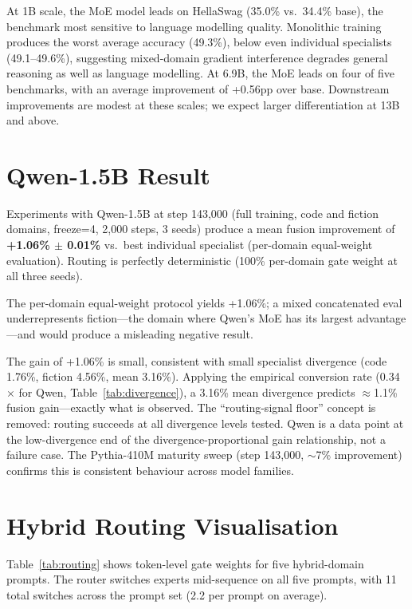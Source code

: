 \documentclass{article}
\begin{document}
At 1B scale, the MoE model leads on HellaSwag (35.0\% vs.\ 34.4\% base), the benchmark most sensitive to language modelling quality. Monolithic training produces the worst average accuracy (49.3\%), below even individual specialists (49.1--49.6\%), suggesting mixed-domain gradient interference degrades general reasoning as well as language modelling. At 6.9B, the MoE leads on four of five benchmarks, with an average improvement of +0.56pp over base. Downstream improvements are modest at these scales; we expect larger differentiation at 13B and above.

\section{Qwen-1.5B Result}
\label{app:qwen}

Experiments with Qwen-1.5B at step 143,000 (full training, code and fiction domains, freeze=4, 2,000 steps, 3 seeds) produce a mean fusion improvement of \textbf{+1.06\% $\pm$ 0.01\%} vs.\ best individual specialist (per-domain equal-weight evaluation). Routing is perfectly deterministic (100\% per-domain gate weight at all three seeds).

The per-domain equal-weight protocol yields +1.06\%; a mixed concatenated eval underrepresents fiction---the domain where Qwen's MoE has its largest advantage---and would produce a misleading negative result.

The gain of +1.06\% is small, consistent with small specialist divergence (code 1.76\%, fiction 4.56\%, mean 3.16\%). Applying the empirical conversion rate (0.34$\times$ for Qwen, Table~\ref{tab:divergence}), a 3.16\% mean divergence predicts $\approx$1.1\% fusion gain---exactly what is observed. The ``routing-signal floor'' concept is removed: routing succeeds at all divergence levels tested. Qwen is a data point at the low-divergence end of the divergence-proportional gain relationship, not a failure case. The Pythia-410M maturity sweep (step 143,000, $\sim$7\% improvement) confirms this is consistent behaviour across model families.

\section{Hybrid Routing Visualisation}
\label{app:routing}

Table~\ref{tab:routing} shows token-level gate weights for five hybrid-domain prompts. The router switches experts mid-sequence on all five prompts, with 11 total switches across the prompt set (2.2 per prompt on average).
\end{document}
